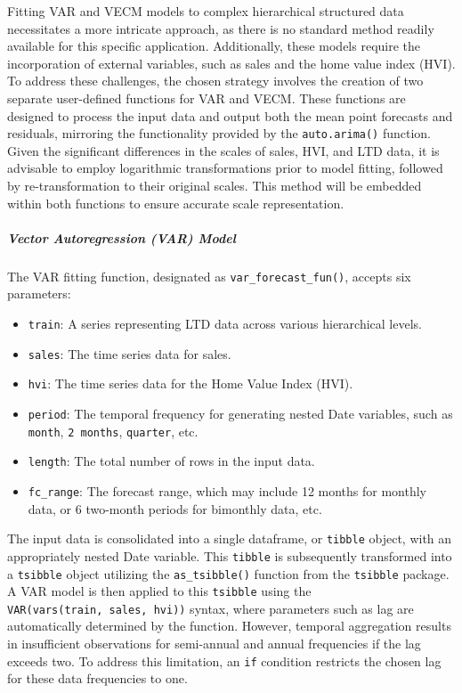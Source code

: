\documentclass[11pt,a4paper,]{article}
\providecommand{\tightlist}{%
  \setlength{\itemsep}{0pt}\setlength{\parskip}{0pt}}
\begin{document}
Fitting VAR and VECM models to complex hierarchical structured data necessitates a more intricate approach, as there is no standard method readily available for this specific application. Additionally, these models require the incorporation of external variables, such as sales and the home value index (HVI). To address these challenges, the chosen strategy involves the creation of two separate user-defined functions for VAR and VECM. These functions are designed to process the input data and output both the mean point forecasts and residuals, mirroring the functionality provided by the \texttt{auto.arima()} function. Given the significant differences in the scales of sales, HVI, and LTD data, it is advisable to employ logarithmic transformations prior to model fitting, followed by re-transformation to their original scales. This method will be embedded within both functions to ensure accurate scale representation.

\subparagraph{Vector Autoregression (VAR) Model}\label{vector-autoregression-var-model}

The VAR fitting function, designated as \texttt{var\_forecast\_fun()}, accepts six parameters:

\begin{itemize}
\tightlist
\item
  \texttt{train}: A series representing LTD data across various hierarchical levels.
\item
  \texttt{sales}: The time series data for sales.
\item
  \texttt{hvi}: The time series data for the Home Value Index (HVI).
\item
  \texttt{period}: The temporal frequency for generating nested Date variables, such as \texttt{month}, \texttt{2\ months}, \texttt{quarter}, etc.
\item
  \texttt{length}: The total number of rows in the input data.
\item
  \texttt{fc\_range}: The forecast range, which may include 12 months for monthly data, or 6 two-month periods for bimonthly data, etc.
\end{itemize}

The input data is consolidated into a single dataframe, or \texttt{tibble} object, with an appropriately nested Date variable. This \texttt{tibble} is subsequently transformed into a \texttt{tsibble} object utilizing the \texttt{as\_tsibble()} function from the \texttt{tsibble} package. A VAR model is then applied to this \texttt{tsibble} using the \texttt{VAR(vars(train,\ sales,\ hvi))} syntax, where parameters such as lag are automatically determined by the function. However, temporal aggregation results in insufficient observations for semi-annual and annual frequencies if the lag exceeds two. To address this limitation, an \texttt{if} condition restricts the chosen lag for these data frequencies to one.
\end{document}
